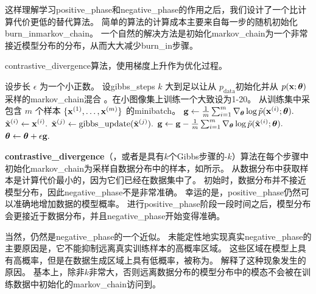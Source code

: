 这样理解学习\gls{positive_phase}和\gls{negative_phase}的作用之后，我们设计了一个比计算代价更低的替代算法。
简单的算法的计算成本主要来自每一步的随机初始化\gls{burn_in}\gls{markov_chain}。
一个自然的解决方法是初始化\gls{markov_chain}为一个非常接近模型分布的分布，从而大大减少\gls{burn_in}步骤。

\begin{algorithm}[ht]
\caption{\gls{contrastive_divergence}算法，使用梯度上升作为优化过程。}
\label{alg:cd}
\begin{algorithmic}
\STATE 设步长 $\epsilon$ 为一个小正数。
\STATE 设\gls{gibbs_steps} $k$ 大到足以让从 $p_\text{data}$初始化并从 $p(\mathbf{x}; \boldsymbol{\theta})$采样的\gls{markov_chain}混合 。在小图像集上训练一个大致设为1-20。
\STATE 从训练集中采包含 $m$ 个样本 $\{ \mathbf{x}^{(1)}, \dots, \mathbf{x}^{(m)}\}$ 的\gls{minibatch}。
\STATE $\mathbf{g} \leftarrow \frac{1}{m} \sum_{i=1}^m \nabla_{\boldsymbol{\theta}} \log \tilde{p}(\mathbf{x}^{(i)}; \boldsymbol{\theta}).$
        \STATE $\tilde{\mathbf{x}}^{(i)} \leftarrow \mathbf{x}^{(i)}.$
    \ENDFOR
{}
        \STATE $\tilde{\mathbf{x}}^{(j)} \leftarrow \text{gibbs\_update}(\tilde{\mathbf{x}}^{(j)}).$
    \ENDFOR
\ENDFOR
\STATE $\mathbf{g} \leftarrow \mathbf{g} - \frac{1}{m} \sum_{i=1}^m \nabla_{\boldsymbol{\theta}} \log \tilde{p}( \tilde{\mathbf{x}}^{(i)} ; \boldsymbol{\theta} ) .$
\STATE $\boldsymbol{\theta} \leftarrow \boldsymbol{\theta} + \epsilon \mathbf{g}.$
\ENDWHILE
\end{algorithmic}
\end{algorithm}


\textbf{\gls{contrastive_divergence}}（，或者是具有$k$个Gibbs步骤的-$k$）算法在每个步骤中初始化\gls{markov_chain}为采样自数据分布中的样本\citep{Hinton-PoE-2000,Hinton-RBMguide-small}，如所示。
从数据分布中获取样本是计算代价最小的，因为它们已经在数据集中了。
初始时，数据分布并不接近模型分布，因此\gls{negative_phase}不是非常准确。
幸运的是，\gls{positive_phase}仍然可以准确地增加数据的模型概率。
进行\gls{positive_phase}阶段一段时间之后，模型分布会更接近于数据分布，并且\gls{negative_phase}开始变得准确。


当然，仍然是\gls{negative_phase}的一个近似。
未能定性地实现真实\gls{negative_phase}的主要原因是，它不能抑制远离真实训练样本的高概率区域。
这些区域在模型上具有高概率，但是在数据生成区域上具有低概率，被称为。
解释了这种现象发生的原因。
基本上，除非$k$非常大，否则远离数据分布的模型分布中的模态不会被在训练数据中初始化的\gls{markov_chain}访问到。


